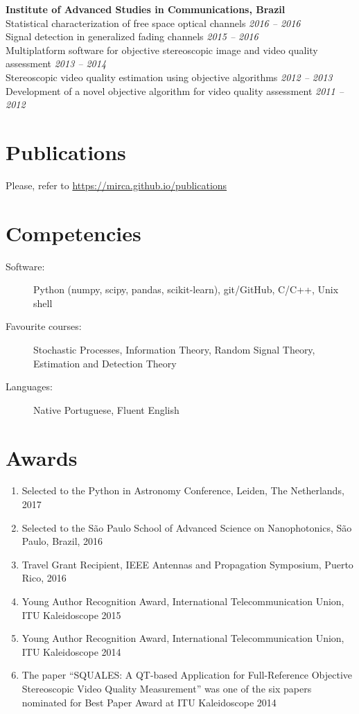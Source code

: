 \documentclass[10pt]{article}
\begin{document}
\begin{titlepage}
    \textbf{Institute of Advanced Studies in Communications, Brazil}\\
    Statistical characterization of free space optical channels \hfill \emph{2016 -- 2016}  \\
    Signal detection in generalized fading channels \hfill \emph{2015 -- 2016} \\
    Multiplatform software for objective stereoscopic image and video quality assessment \hfill \emph{2013 -- 2014} \\
    Stereoscopic video quality estimation using objective algorithms \hfill \emph{2012 -- 2013} \\
    Development of a novel objective algorithm for video quality assessment \hfill \emph{2011 -- 2012}

\section*{Publications}
Please, refer to \url{https://mirca.github.io/publications}

\section*{Competencies}
\begin{description}
    \item[Software:] Python (numpy, scipy, pandas, scikit-learn), git/GitHub, C/C++, Unix shell
    \item[Favourite courses:] Stochastic Processes, Information Theory, Random Signal Theory, Estimation and Detection Theory
    \item[Languages:] Native Portuguese, Fluent English
\end{description}

\section*{Awards}
\begin{enumerate}
  \item Selected to the Python in Astronomy Conference, Leiden, The Netherlands, 2017
  \item Selected to the S\~ao Paulo School of Advanced Science on Nanophotonics, S\~ao Paulo, Brazil, 2016
  \item Travel Grant Recipient, IEEE Antennas and Propagation Symposium, Puerto Rico, 2016
  \item Young Author Recognition Award, International Telecommunication Union, ITU Kaleidoscope 2015
  \item Young Author Recognition Award, International Telecommunication Union, ITU Kaleidoscope 2014
  \item The paper ``SQUALES: A QT-based Application for Full-Reference Objective Stereoscopic Video Quality Measurement'' was one of the six papers nominated for Best Paper Award at ITU Kaleidoscope 2014
\end{enumerate}


\end{titlepage}
\end{document}
